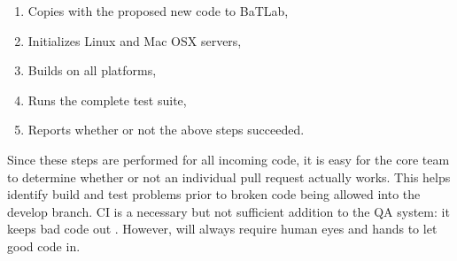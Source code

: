 \begin{enumerate}
    \item Copies \Cyclus with the proposed new code to BaTLab,
    \item Initializes Linux and Mac OSX servers,
    \item Builds \Cyclus on all platforms,
    \item Runs the complete \Cyclus test suite,
    \item Reports whether or not the above steps succeeded.
\end{enumerate}

Since these steps are performed for all incoming code, it is easy for the
\Cyclus core team to determine whether or not an individual pull request
actually works. This helps identify build and test problems prior to
broken code being allowed into the develop branch. \gls{CI} is a necessary
but not sufficient addition to the \Cyclus \gls{QA}
system: it keeps bad code out \Cyclus. However, \Cyclus will always
require human eyes and hands to let good code in.
